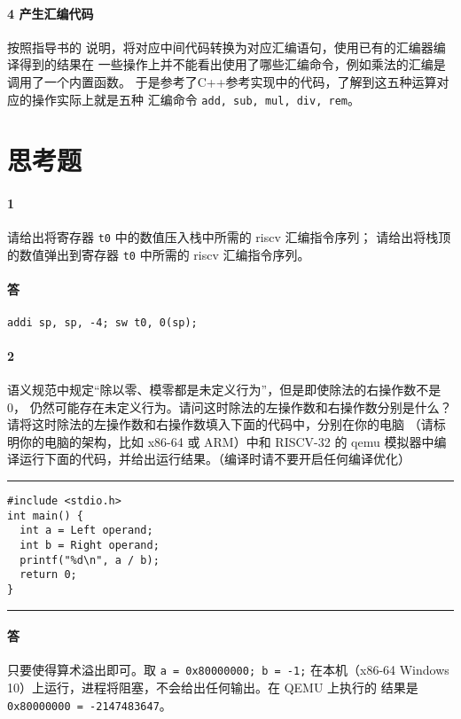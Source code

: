 \documentclass[UTF8]{ctexart}
\newcommand{\T}[1]{\texttt{{#1}}}
\begin{document}
            \paragraph{4 产生汇编代码} 按照指导书的
            说明，将对应中间代码转换为对应汇编语句，使用已有的汇编器编译得到的结果在
            一些操作上并不能看出使用了哪些汇编命令，例如乘法的汇编是调用了一个内置函数。
            于是参考了C++参考实现中的代码，了解到这五种运算对应的操作实际上就是五种
            汇编命令 \T{add, sub, mul, div, rem}。
        
    \section{思考题}
        \paragraph{1} 请给出将寄存器 \T{t0} 中的数值压入栈中所需的 riscv 汇编指令序列；
        请给出将栈顶的数值弹出到寄存器 \T{t0} 中所需的 riscv 汇编指令序列。
        \paragraph{答} \T{addi sp, sp, -4; sw t0, 0(sp);}
        \paragraph{2} 语义规范中规定“除以零、模零都是未定义行为”，但是即使除法的右操作数不是 0，
        仍然可能存在未定义行为。请问这时除法的左操作数和右操作数分别是什么？
        请将这时除法的左操作数和右操作数填入下面的代码中，分别在你的电脑
        （请标明你的电脑的架构，比如 x86-64 或 ARM）中和 RISCV-32 的 
        qemu 模拟器中编译运行下面的代码，并给出运行结果。（编译时请不要开启任何编译优化）
        
        \noindent\rule{\textwidth}{1pt}
        \begin{lstlisting}[style=lfonts]
#include <stdio.h>
int main() {
  int a = Left operand;
  int b = Right operand;
  printf("%d\n", a / b);
  return 0;
}
        \end{lstlisting}
        \noindent\rule{\textwidth}{1pt}

        \paragraph{答} 只要使得算术溢出即可。取 \T{a = 0x80000000; b = -1;} 
        在本机（x86-64 Windows 10）上运行，进程将阻塞，不会给出任何输出。在 QEMU 上执行的
        结果是 \T{0x80000000 = -2147483647}。
\end{document}
